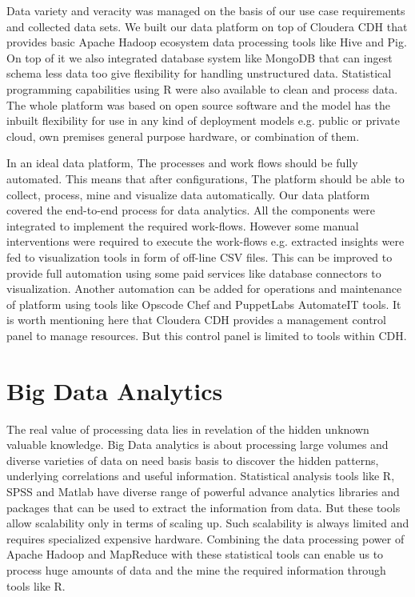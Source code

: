 Data variety and veracity was managed on the basis of our use case requirements and collected data sets. We built our data platform on top of Cloudera CDH that provides basic Apache Hadoop ecosystem data processing tools like Hive and Pig. On top of it we also integrated database system like MongoDB that can ingest schema less data too give flexibility for handling unstructured data. Statistical programming capabilities using R were also available to clean and process data. The whole platform was based on open source software and the model has the inbuilt flexibility for use in any kind of deployment models e.g. public or private cloud, own premises general purpose hardware, or combination of them. 

In an ideal data platform, The processes and work flows should be fully automated. This means that after configurations, The platform should be able to collect, process, mine and visualize data automatically. Our data platform covered the end-to-end process for data analytics. All the components were integrated to implement the required work-flows. However some manual interventions were required to execute the work-flows e.g. extracted insights were fed to visualization tools in form of off-line CSV files. This can be improved to provide full automation using some paid services like database connectors to visualization. Another automation can be added for operations and maintenance of platform using tools like Opscode Chef and PuppetLabs AutomateIT tools. It is worth mentioning here that Cloudera CDH provides a management control panel to manage resources. But this control panel is limited to tools within CDH. 
\section{Big Data Analytics}
The real value of processing data lies in revelation of  the hidden unknown valuable knowledge. Big Data analytics is about processing large volumes and diverse varieties of data on need basis basis to discover the hidden patterns, underlying correlations and useful information. Statistical analysis tools like R, SPSS and Matlab have diverse range of powerful advance analytics libraries and packages that can be used to extract the information from data. But these tools allow scalability only in terms of scaling up. Such scalability is always limited and requires specialized expensive hardware. Combining the data processing power of Apache Hadoop and MapReduce with these statistical tools can enable us to process huge amounts of data and the mine the required information through tools like R.

